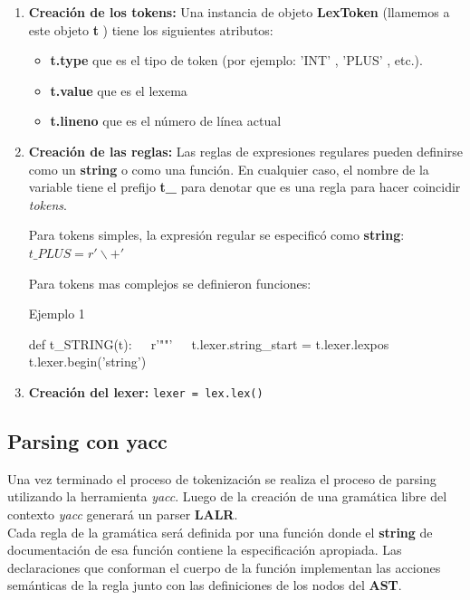 \documentclass[a4paper,10pt,twocolumn]{article}
\begin{document}
\begin{enumerate}
	\item \textbf{Creación de los tokens:} 
	Una instancia de objeto \textbf{LexToken} (llamemos a este objeto \textbf{t} ) tiene los siguientes atributos:
	\begin{itemize}
		\item \textbf{t.type} que es el tipo de token (por ejemplo: 'INT' , 'PLUS' , etc.).
		\item \textbf{t.value} que es el lexema
		\item \textbf{t.lineno} que es el número de línea actual
	\end{itemize} 

	\item \textbf{Creación de las reglas: }
	Las reglas de expresiones regulares pueden definirse como un \textbf{string} o como una función. En cualquier caso, el nombre de la variable tiene el prefijo \textbf{t\_} para denotar que es una regla para hacer coincidir \textit{tokens}.
	
	Para tokens simples, la expresión regular se especificó como \textbf{string}: $t\_PLUS = r'\backslash+'$
	
	Para tokens mas complejos se definieron funciones:
	
	\begin{algorithm}
		\caption{Ejemplo 1}
		\begin{algorithmic}
			\STATE def t\_STRING(t):
			\STATE $\;\;\; $ r'""'
			\STATE $\;\;\; $ t.lexer.string\_start = t.lexer.lexpos
			\STATE $\;\;\; $ t.lexer.begin('string')
		\end{algorithmic}
	\end{algorithm}
	\item \textbf{Creación del lexer:} \lstinline|lexer = lex.lex()|
\end{enumerate}

\subsection{Parsing con yacc}

Una vez terminado el proceso de tokenización se realiza el proceso de parsing utilizando la herramienta \textit{yacc}. Luego de la creación de una gramática libre del contexto \textit{yacc} generará un parser \textbf{LALR}.\\

Cada regla de la gramática será definida por una función donde el \textbf{string} de documentación de esa función contiene la especificación apropiada. Las declaraciones que conforman el cuerpo de la función implementan las acciones semánticas de la regla junto con las definiciones de los nodos del \textbf{AST}.
\end{document}
